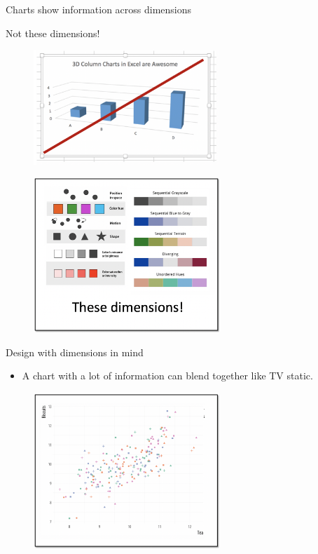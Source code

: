 \documentclass[aspectratio=169]{beamer}
\begin{document}
\begin{frame}{Charts show information across dimensions}
	\begin{multicols}{2}	
		
		Not these dimensions!
		
		\begin{figure}
			\centering
			\includegraphics[width=70mm]{img/Dimensions}
		\end{figure}
		
		\begin{figure}
			\centering
			\includegraphics[width=70mm]{img/Dimensions2}
		\end{figure}
		
	\end{multicols}
\end{frame}


\begin{frame}{Design with dimensions in mind}
		
		\begin{itemize}[<default overlay specification>]
			\item<1> A chart with a lot of information can blend together like TV static.
		\end{itemize}
		
		\begin{figure}
			\centering
			\includegraphics[width=70mm]{img/Dimensions4}
		\end{figure}
		
\end{frame}
\end{document}
